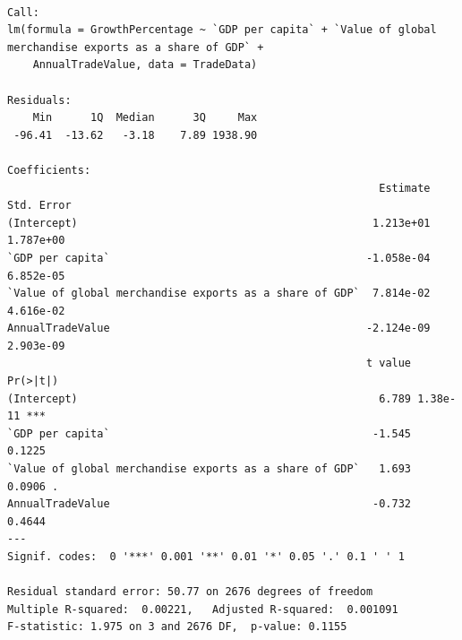 \documentclass[
  10pt,
]{article}
\begin{document}
\begin{verbatim}

Call:
lm(formula = GrowthPercentage ~ `GDP per capita` + `Value of global merchandise exports as a share of GDP` + 
    AnnualTradeValue, data = TradeData)

Residuals:
    Min      1Q  Median      3Q     Max 
 -96.41  -13.62   -3.18    7.89 1938.90 

Coefficients:
                                                          Estimate Std. Error
(Intercept)                                              1.213e+01  1.787e+00
`GDP per capita`                                        -1.058e-04  6.852e-05
`Value of global merchandise exports as a share of GDP`  7.814e-02  4.616e-02
AnnualTradeValue                                        -2.124e-09  2.903e-09
                                                        t value Pr(>|t|)    
(Intercept)                                               6.789 1.38e-11 ***
`GDP per capita`                                         -1.545   0.1225    
`Value of global merchandise exports as a share of GDP`   1.693   0.0906 .  
AnnualTradeValue                                         -0.732   0.4644    
---
Signif. codes:  0 '***' 0.001 '**' 0.01 '*' 0.05 '.' 0.1 ' ' 1

Residual standard error: 50.77 on 2676 degrees of freedom
Multiple R-squared:  0.00221,   Adjusted R-squared:  0.001091 
F-statistic: 1.975 on 3 and 2676 DF,  p-value: 0.1155
\end{verbatim}
\end{document}
